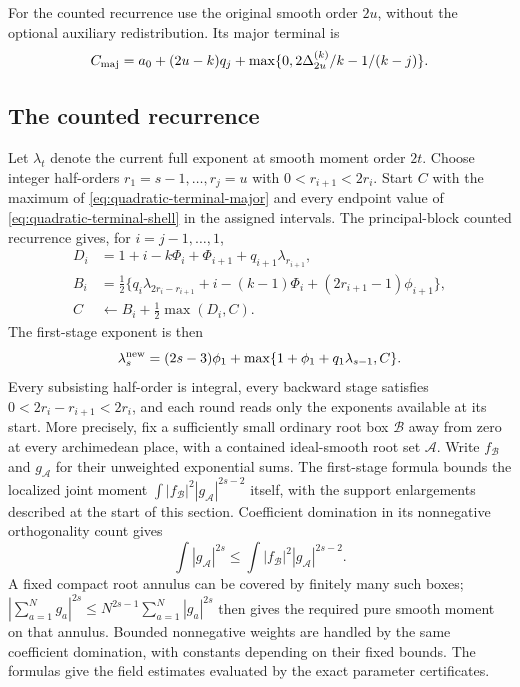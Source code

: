 \documentclass[11pt]{amsart}
\theoremstyle{definition}
\numberwithin{equation}{section}
\begin{document}
For the counted recurrence use the original smooth order $2u$,
without the optional auxiliary redistribution. Its major terminal is
\begin{equation}\label{eq:quadratic-terminal-major}
 C_{\rm maj}=a_0+(2u-k)q_j+
              \max\{0,2\Delta_{2u}^{(k)}/k-1/(k-j)\}.
\end{equation}

\subsection{The counted recurrence}

Let $\lambda_t$ denote the current full exponent at smooth
moment order $2t$. Choose integer half-orders
$r_1=s-1,\ldots,r_j=u$ with $0<r_{i+1}<2r_i$.
Start $C$ with the maximum of
\eqref{eq:quadratic-terminal-major} and every endpoint value of
\eqref{eq:quadratic-terminal-shell} in the assigned intervals.
The principal-block counted recurrence gives, for $i=j-1,\ldots,1$,
\[
 \begin{split}
 D_i&=1+i-k\Phi_i+\Phi_{i+1}+q_{i+1}\lambda_{r_{i+1}},\\
 B_i&=\tfrac12\{q_i\lambda_{2r_i-r_{i+1}}
                   +i-(k-1)\Phi_i+(2r_{i+1}-1)\phi_{i+1}\},\\
 C&\longleftarrow B_i+\tfrac12\max(D_i,C).
 \end{split}
\]
The first-stage exponent is then
\[
 \lambda_s^{\rm new}=(2s-3)\phi_1+
           \max\{1+\phi_1+q_1\lambda_{s-1},C\}.
\]
Every subsisting half-order is integral, every backward stage satisfies
$0<2r_i-r_{i+1}<2r_i$, and each round reads only the exponents available
at its start. More precisely, fix a sufficiently small ordinary root box
$\mathcal B$ away from zero at every archimedean place, with a contained
ideal-smooth root set $\mathcal A$. Write $f_{\mathcal B}$ and
$g_{\mathcal A}$ for their unweighted exponential sums. The first-stage
formula bounds the localized joint moment
$\int|f_{\mathcal B}|^2|g_{\mathcal A}|^{2s-2}$ itself, with the support
enlargements described at the start of this section. Coefficient domination
in its nonnegative orthogonality count gives
\[
 \int|g_{\mathcal A}|^{2s}
 \le \int|f_{\mathcal B}|^2|g_{\mathcal A}|^{2s-2}.
\]
A fixed compact root annulus can be covered by finitely many such boxes;
$|\sum_{a=1}^N g_a|^{2s}\le N^{2s-1}\sum_{a=1}^N|g_a|^{2s}$ then gives
the required pure smooth moment on that annulus. Bounded nonnegative
weights are handled by the same coefficient domination, with constants
depending on their fixed bounds. The formulas give the field estimates evaluated by the exact parameter certificates.
\end{document}
